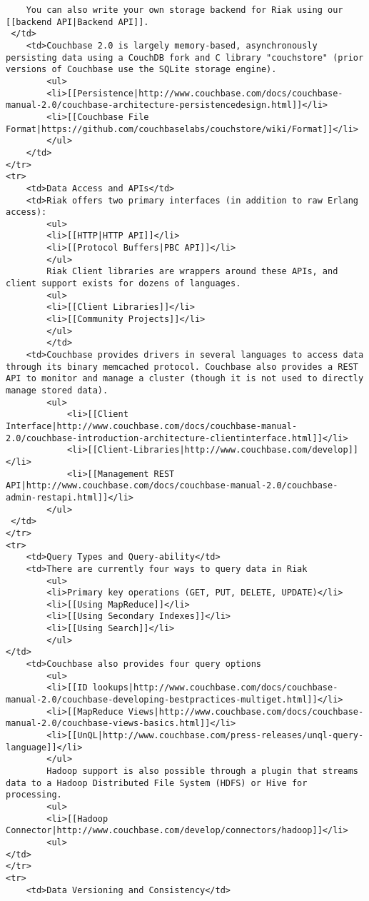 \documentclass[letter]{book}
\begin{document}
\begin{shaded}
\begin{verbatim}
    You can also write your own storage backend for Riak using our [[backend API|Backend API]].
 </td>
    <td>Couchbase 2.0 is largely memory-based, asynchronously persisting data using a CouchDB fork and C library "couchstore" (prior versions of Couchbase use the SQLite storage engine).
        <ul>
        <li>[[Persistence|http://www.couchbase.com/docs/couchbase-manual-2.0/couchbase-architecture-persistencedesign.html]]</li>
        <li>[[Couchbase File Format|https://github.com/couchbaselabs/couchstore/wiki/Format]]</li>
        </ul>
    </td>
</tr>
<tr>
    <td>Data Access and APIs</td>
    <td>Riak offers two primary interfaces (in addition to raw Erlang access):
		<ul>
		<li>[[HTTP|HTTP API]]</li>
		<li>[[Protocol Buffers|PBC API]]</li>
		</ul>
		Riak Client libraries are wrappers around these APIs, and client support exists for dozens of languages. 
		<ul>
		<li>[[Client Libraries]]</li>
		<li>[[Community Projects]]</li>
		</ul>
		</td>
    <td>Couchbase provides drivers in several languages to access data through its binary memcached protocol. Couchbase also provides a REST API to monitor and manage a cluster (though it is not used to directly manage stored data).
        <ul>
            <li>[[Client Interface|http://www.couchbase.com/docs/couchbase-manual-2.0/couchbase-introduction-architecture-clientinterface.html]]</li>
            <li>[[Client-Libraries|http://www.couchbase.com/develop]]</li>
            <li>[[Management REST API|http://www.couchbase.com/docs/couchbase-manual-2.0/couchbase-admin-restapi.html]]</li>
        </ul>
 </td>
</tr>
<tr>
    <td>Query Types and Query-ability</td>
    <td>There are currently four ways to query data in Riak
        <ul>
        <li>Primary key operations (GET, PUT, DELETE, UPDATE)</li>
        <li>[[Using MapReduce]]</li>
        <li>[[Using Secondary Indexes]]</li>
        <li>[[Using Search]]</li>
        </ul>
</td>
    <td>Couchbase also provides four query options
        <ul>
        <li>[[ID lookups|http://www.couchbase.com/docs/couchbase-manual-2.0/couchbase-developing-bestpractices-multiget.html]]</li>
        <li>[[MapReduce Views|http://www.couchbase.com/docs/couchbase-manual-2.0/couchbase-views-basics.html]]</li>
        <li>[[UnQL|http://www.couchbase.com/press-releases/unql-query-language]]</li>
        </ul>
        Hadoop support is also possible through a plugin that streams data to a Hadoop Distributed File System (HDFS) or Hive for processing.
        <ul>
        <li>[[Hadoop Connector|http://www.couchbase.com/develop/connectors/hadoop]]</li>
        <ul>
</td>
</tr>
<tr>
    <td>Data Versioning and Consistency</td>

\end{verbatim}
\end{shaded}
\end{document}
